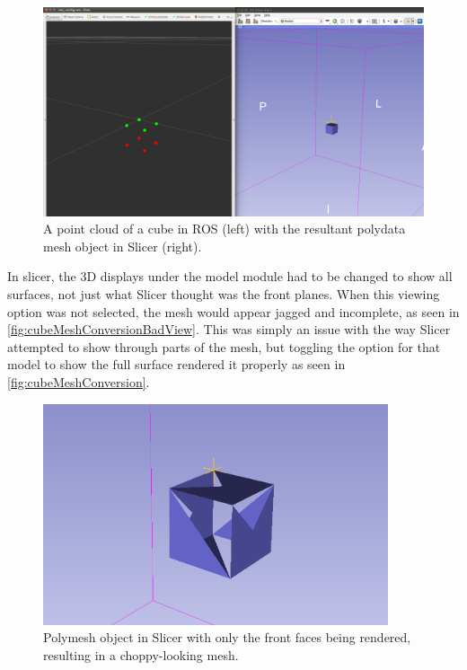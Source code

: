 \documentclass[12pt]{report}
\begin{document}
\begin{figure}[thpb]
	\centering
	\includegraphics[width=\textwidth]{images/cube_mesh_rviz_slicer.png}
    \caption{A point cloud of a cube in ROS (left) with the resultant polydata mesh object in Slicer (right).}
    \label{fig:cubeMeshConversion}
\end{figure}

In slicer, the 3D displays under the model module had to be changed to show all surfaces, not just what Slicer thought was the front planes. When this viewing option was not selected, the mesh would appear jagged and incomplete, as seen in \autoref{fig:cubeMeshConversionBadView}. This was simply an issue with the way Slicer attempted to show through parts of the mesh, but toggling the option for that model to show the full surface rendered it properly as seen in \autoref{fig:cubeMeshConversion}.

\begin{figure}[thpb]
	\centering
	\includegraphics[width=4in]{images/jagged_slicer_mesh.png}
    \caption{Polymesh object in Slicer with only the front faces being rendered, resulting in a choppy-looking mesh.}
    \label{fig:cubeMeshConversionBadView}
\end{figure}
\end{document}

